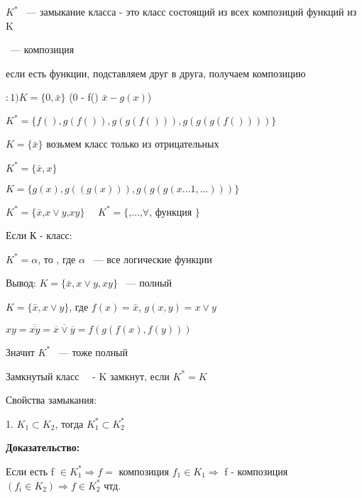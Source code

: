 \documentclass[russian]{lecture-notes}
\begin{document}
			$K^{*}$ ~--- замыкание класса - это класс состоящий из всех композиций функций из K


			 ~--- композиция

			если есть функции, подставляем друг в друга, получаем композицию

	\begin{example}
		$:1) K = \{0,\bar{x}\}$ \quad (0 - f() $\bar{x} - g(x)$)

		$K^{*} = \{ f(), g(f()), g(g(f())), g(g(g(f())))\}$
\end{example}
	\begin{example}
		$K = \{\bar{x}\}$ возьмем класс только из отрицательных

		$K^{*} = \{ \bar{x}, x\}$

		$K = \{ g(x), g((g(x))), g(g(g(x \dots 1, \dots )))\}$
\end{example}
	\begin{example}
		$K^{*}=\{ \bar{x}$,$ x \lor y$,$ xy \}$  $\quad K^{*} = \{ $,$ \dots$,$ \forall$, функция $\}$
	\end{example}

	\begin{definition}

		Если К - класс:

		$K^{*} = \alpha$, то , где $\alpha$ ~--- все логические функции

		Вывод: $K = \{ \bar{x}, x \lor y, xy\}$ ~--- полный

		\end{definition}
		\begin{example}

			$K = \{\bar{x}, x \lor y \}$, где $f(x) = \bar{x}$, $g(x, y) = x \lor y$
		\end{example}
		
		$xy = \overline{\overline{xy}} = \overline{\overline{x} \lor \overline{y}}
		 = f(g(f(x),f(y)))$  %

		Значит $K^{*}$ ~--- тоже полный


	\begin{definition}
		Замкнутый класс ~~- K замкнут, если $K^{*} = K$
		\end{definition}

	Свойства замыкания:

	1. $K_{1} \subset K_{2}$, тогда $K_{1}^{*} \subset K_{2}^{*}$

	\textbf{Доказательство:}

		Если есть f $\in K_{1}^{*} \Rightarrow f = $ композиция $f_{1} \in K_{1} \Rightarrow$
	f - композиция $(f_{i} \in K_{2}) \Rightarrow f \in K_{2}^{*} $ чтд.
\end{document}
